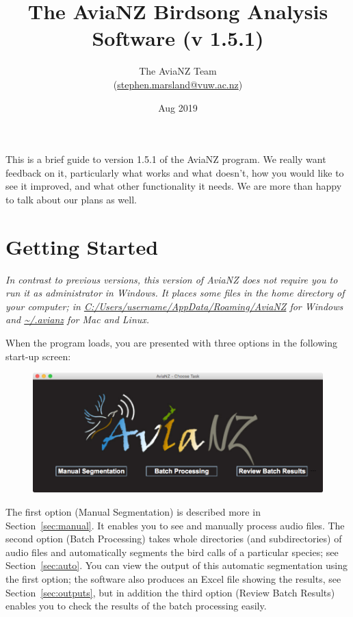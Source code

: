 \documentclass{article}
\title{The AviaNZ Birdsong Analysis Software (v 1.5.1)}
\author{The AviaNZ Team \\(\url{stephen.marsland@vuw.ac.nz})}
\date{Aug 2019}
\begin{document}
\maketitle



This is a brief guide to version 1.5.1 of the AviaNZ program.
We really want feedback on it, particularly what works and what doesn't, how you would like to see it improved, and what other functionality it needs. We are more than happy to talk about our plans as well. 


\section{Getting Started}

{\em In contrast to previous versions, this version of AviaNZ does not require you to run it as administrator in Windows. It places some files in the home directory of your computer; in \url{C:/Users/username/AppData/Roaming/AviaNZ} for Windows and \url{~/.avianz} for Mac and Linux.}

When the program loads, you are presented with three options in the following start-up screen:

\begin{figure}[h!]
\centering
\includegraphics[width=.3\textwidth]{Figs/splashscreen}
\label{welcome}
\end{figure}

The first option (Manual Segmentation) is described more in Section~\ref{sec:manual}. It enables you to see and manually process audio files. The second option (Batch Processing) takes whole directories (and subdirectories) of audio files and automatically segments the bird calls of a particular species; see Section~\ref{sec:auto}. You can view the output of this automatic segmentation using the first option; the software also produces an Excel file showing the results, see Section~\ref{sec:outputs}, but in addition the third option (Review Batch Results) enables you to check the results of the batch processing easily. 
\end{document}
